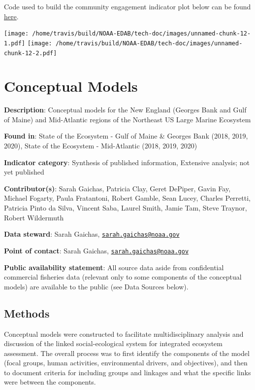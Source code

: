 \documentclass[
]{book}
\begin{document}
Code used to build the community engagement indicator plot below can be found \href{https://github.com/NOAA-EDAB/ecodata/blob/master/chunk-scripts/LTL.Rmd-MAB-comm-eng.R}{here}.

\texttt{[image: /home/travis/build/NOAA-EDAB/tech-doc/images/unnamed-chunk-12-1.pdf]} \texttt{[image: /home/travis/build/NOAA-EDAB/tech-doc/images/unnamed-chunk-12-2.pdf]}

\hypertarget{conceptual-models}{%
\chapter{Conceptual Models}\label{conceptual-models}}

\textbf{Description}: Conceptual models for the New England (Georges Bank and Gulf of Maine) and Mid-Atlantic regions of the Northeast US Large Marine Ecosystem

\textbf{Found in}: State of the Ecosystem - Gulf of Maine \& Georges Bank (2018, 2019, 2020), State of the Ecosystem - Mid-Atlantic (2018, 2019, 2020)

\textbf{Indicator category}: Synthesis of published information, Extensive analysis; not yet published

\textbf{Contributor(s)}: Sarah Gaichas, Patricia Clay, Geret DePiper, Gavin Fay, Michael Fogarty, Paula Fratantoni, Robert Gamble, Sean Lucey, Charles Perretti, Patricia Pinto da Silva, Vincent Saba, Laurel Smith, Jamie Tam, Steve Traynor, Robert Wildermuth

\textbf{Data steward}: Sarah Gaichas, \href{mailto:sarah.gaichas@noaa.gov}{\nolinkurl{sarah.gaichas@noaa.gov}}

\textbf{Point of contact}: Sarah Gaichas, \href{mailto:sarah.gaichas@noaa.gov}{\nolinkurl{sarah.gaichas@noaa.gov}}

\textbf{Public availability statement}: All source data aside from confidential commercial fisheries data (relevant only to some components of the conceptual models) are available to the public (see Data Sources below).

\hypertarget{methods-11}{%
\section{Methods}\label{methods-11}}

Conceptual models were constructed to facilitate multidisciplinary analysis and discussion of the linked social-ecological system for integrated ecosystem assessment. The overall process was to first identify the components of the model (focal groups, human activities, environmental drivers, and objectives), and then to document criteria for including groups and linkages and what the specific links were between the components.
\end{document}
